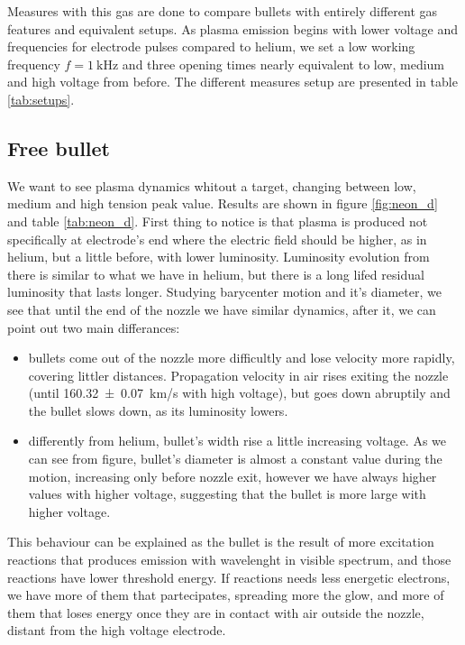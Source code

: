 Measures with this gas are done to compare bullets with entirely different gas features and equivalent setups. As plasma emission begins with lower voltage and frequencies for electrode pulses compared to helium, we set a low working frequency $f = \SI{1}{\kilo\hertz}$ and three opening times nearly equivalent to low, medium and high voltage from before. The different measures setup are presented in table \ref{tab:setups}.

\subsection{Free bullet}
We want to see plasma dynamics whitout a target, changing between low, medium and high tension peak value. Results are shown in figure \ref{fig:neon_d} and table \ref{tab:neon_d}.
First thing to notice is that plasma is produced not specifically at electrode's end where the electric field should be higher, as in helium, but a little before, with lower luminosity. Luminosity evolution from there is similar to what we have in helium, but there is a long lifed residual luminosity that lasts longer.
Studying barycenter motion and it's diameter, we see that until the end of the nozzle we have similar dynamics, after it, we can point out two main differances:
\begin{itemize}
 \item bullets come out of the nozzle more difficultly and lose velocity more rapidly, covering littler distances. Propagation velocity in air rises exiting the nozzle (until \SI{160.32(7)}{\kilo\meter/\second} with high voltage), but goes down abruptily and the bullet slows down, as its luminosity lowers.
 \item differently from helium, bullet's width rise a little increasing voltage. As we can see from figure, bullet's diameter is almost a constant value during the motion, increasing only before nozzle exit, however we have always higher values with higher voltage, suggesting that the bullet is more large with higher voltage.
\end{itemize}

This behaviour can be explained as the bullet is the result of more excitation reactions that produces emission with wavelenght in visible spectrum, and those reactions have lower threshold energy. If reactions needs less energetic electrons, we have more of them that partecipates, spreading more the glow, and more of them that loses energy once they are in contact with air outside the nozzle, distant from the high voltage electrode.

